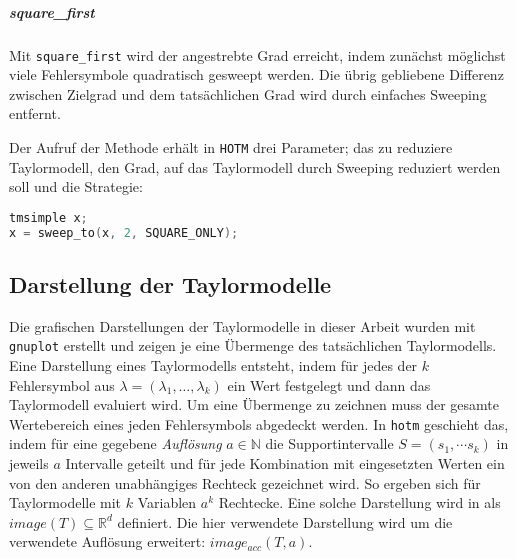 \subparagraph{square\_first}
Mit \verb+square_first+ wird der angestrebte Grad erreicht, indem zunächst möglichst viele Fehlersymbole quadratisch gesweept werden. Die übrig gebliebene Differenz zwischen Zielgrad und dem tatsächlichen Grad wird durch einfaches Sweeping entfernt.

Der Aufruf der Methode erhält in \verb+HOTM+ drei Parameter; das zu reduziere Taylormodell, den Grad, auf das Taylormodell durch Sweeping reduziert werden soll und die Strategie:

 \begin{lstlisting}[language=C++, style=cpp, caption=Beispielaufruf der Sweeping-Routine,captionpos=b,xleftmargin=15pt]
tmsimple x;
x = sweep_to(x, 2, SQUARE_ONLY);
\end{lstlisting}



\subsection{Darstellung der Taylormodelle}
Die grafischen Darstellungen der Taylormodelle in dieser Arbeit wurden mit \verb+gnuplot+ \cite{gnuplot} erstellt und zeigen je eine Übermenge des tatsächlichen Taylormodells. Eine Darstellung eines Taylormodells entsteht, indem für jedes der $k$ Fehlersymbol aus $\lambda=(\lambda_1, \dots, \lambda_k)$ ein Wert festgelegt und dann das Taylormodell evaluiert wird. Um eine Übermenge zu zeichnen muss der gesamte Wertebereich eines jeden Fehlersymbols abgedeckt werden. In \verb+hotm+ geschieht das, indem für eine gegebene \textit{Auflösung} $a \in \mathbb{N}$ die Supportintervalle $S=(s_1, \cdots s_k)$ in jeweils $a$ Intervalle geteilt und für jede Kombination mit eingesetzten Werten ein von den anderen unabhängiges Rechteck gezeichnet wird. So ergeben sich für Taylormodelle mit $k$ Variablen $a^k$ Rechtecke. Eine solche Darstellung wird in \cite{DBLP:conf/macis/BrausseKM15} als $image(T) \subseteq \mathbb{R}^d$ definiert. Die hier verwendete Darstellung wird um die verwendete Auflösung erweitert: $image_{acc}(T,a)$.


